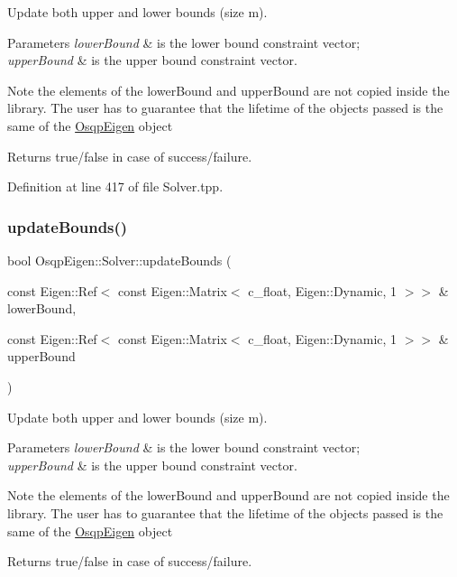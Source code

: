 Update both upper and lower bounds (size m). 


\begin{DoxyParams}{Parameters}
{\em lower\+Bound} & is the lower bound constraint vector; \\
\hline
{\em upper\+Bound} & is the upper bound constraint vector. \\
\hline
\end{DoxyParams}
\begin{DoxyNote}{Note}
the elements of the lower\+Bound and upper\+Bound are not copied inside the library. The user has to guarantee that the lifetime of the objects passed is the same of the \mbox{\hyperlink{namespaceOsqpEigen}{Osqp\+Eigen}} object 
\end{DoxyNote}
\begin{DoxyReturn}{Returns}
true/false in case of success/failure. 
\end{DoxyReturn}


Definition at line 417 of file Solver.\+tpp.

\mbox{\label{classOsqpEigen_1_1Solver_a3b1b976e9c432624abc614c8d7d0e20c}} 
\subsubsection{\texorpdfstring{update\+Bounds()}{updateBounds()}\hspace{0.1cm}{\footnotesize\ttfamily [2/2]}}
{\footnotesize\ttfamily bool Osqp\+Eigen\+::\+Solver\+::update\+Bounds (\begin{DoxyParamCaption}\item[{const Eigen\+::\+Ref$<$ const Eigen\+::\+Matrix$<$ c\+\_\+float, Eigen\+::\+Dynamic, 1 $>$$>$ \&}]{lower\+Bound,  }\item[{const Eigen\+::\+Ref$<$ const Eigen\+::\+Matrix$<$ c\+\_\+float, Eigen\+::\+Dynamic, 1 $>$$>$ \&}]{upper\+Bound }\end{DoxyParamCaption})}



Update both upper and lower bounds (size m). 


\begin{DoxyParams}{Parameters}
{\em lower\+Bound} & is the lower bound constraint vector; \\
\hline
{\em upper\+Bound} & is the upper bound constraint vector. \\
\hline
\end{DoxyParams}
\begin{DoxyNote}{Note}
the elements of the lower\+Bound and upper\+Bound are not copied inside the library. The user has to guarantee that the lifetime of the objects passed is the same of the \mbox{\hyperlink{namespaceOsqpEigen}{Osqp\+Eigen}} object 
\end{DoxyNote}
\begin{DoxyReturn}{Returns}
true/false in case of success/failure. 
\end{DoxyReturn}


